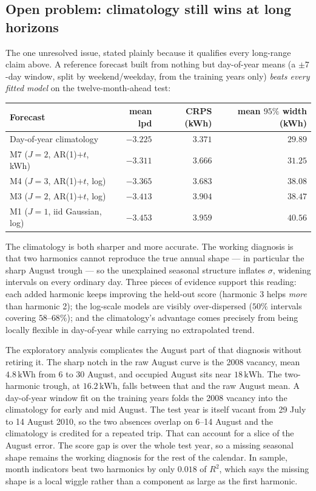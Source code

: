 \documentclass[11pt]{article}
\newcommand{\kwh}{\,\mathrm{kWh}}
\begin{document}
\subsection{Open problem: climatology still wins at long horizons}

The one unresolved issue, stated plainly because it qualifies every long-range
claim above. A reference forecast built from nothing but day-of-year means
(a $\pm 7$-day window, split by weekend/weekday, from the training years only)
\emph{beats every fitted model} on the twelve-month-ahead test:

\begin{center}
\small
\begin{tabular}{@{}lrrr@{}}
\toprule
Forecast & mean lpd & CRPS (kWh) & mean $95\%$ width (kWh) \\
\midrule
Day-of-year climatology & $\mathbf{-3.225}$ & $\mathbf{3.371}$ & $29.89$ \\
M7 ($J{=}2$, AR(1)$+t$, kWh) & $-3.311$ & $3.666$ & $31.25$ \\
M4 ($J{=}3$, AR(1)$+t$, log) & $-3.365$ & $3.683$ & $38.08$ \\
M3 ($J{=}2$, AR(1)$+t$, log) & $-3.413$ & $3.904$ & $38.47$ \\
M1 ($J{=}1$, iid Gaussian, log) & $-3.453$ & $3.959$ & $40.56$ \\
\bottomrule
\end{tabular}
\end{center}

The climatology is both sharper and more accurate. The working diagnosis is
that two harmonics cannot reproduce the true annual shape --- in particular the
sharp August trough --- so the unexplained seasonal structure inflates $\sigma$,
widening intervals on every ordinary day. Three pieces of evidence support this
reading: each added harmonic keeps improving the held-out score (harmonic 3
helps \emph{more} than harmonic 2); the log-scale models are visibly
over-dispersed ($50\%$ intervals covering $58$--$68\%$); and the climatology's
advantage comes precisely from being locally flexible in day-of-year while
carrying no extrapolated trend.

The exploratory analysis complicates the August part of that diagnosis
without retiring it. The sharp notch in the raw August curve is the 2008
vacancy, mean $4.8\kwh$ from 6 to 30 August, and occupied August sits near
$18\kwh$. The two-harmonic trough, at $16.2\kwh$, falls between that and the
raw August mean. A day-of-year window fit on the
training years folds the 2008 vacancy into the climatology for early and mid
August. The test year is itself vacant from 29 July to 14 August 2010, so the
two absences overlap on 6--14 August and the climatology is credited for a
repeated trip. That can account for a slice of the August error. The score
gap is over the whole test year, so a missing seasonal shape remains the
working diagnosis for the rest of the calendar. In sample, month indicators
beat two harmonics by only $0.018$ of $R^2$, which says the missing shape is
a local wiggle rather than a component as large as the first harmonic.
\end{document}

